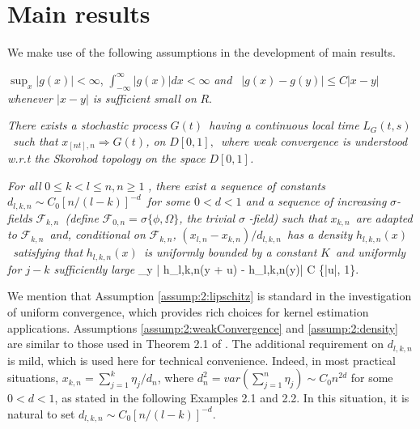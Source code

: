 \section{Main results}

We make use of the following assumptions in the development of main results.

\begin{assump} 
	$\sup_x|g(x)|<\infty$, $\int_{-\infty}^{\infty}|g(x)|dx<\infty$ \textit{and }\textit{\
	$|g(x)-g(y)|\le C|x-y|$ whenever  $|x-y|$ is sufficient small on }$R$.
\end{assump}

\begin{assump} 
\textit{There exists a stochastic process }%
$G(t)$\textit{\ having a continuous local time
}$L_{G}(t,s)$\textit{\ such that }$x_{[nt],n}\Rightarrow
G(t)$\textit{, on }$D[0,1],$\textit{\ where
weak convergence is understood w.r.t the Skorohod topology on the space }$%
D[0,1]$\textit{.}
\end{assump}

\begin{assump} 
 \textit{For all }$0\leq k<l\leq n,n\geq 1$ \textit{, there exist a sequence of constants }$d_{l,k,n}\sim C_0 [n/(l-k)]^{-d}$\textit{\ for some $0< d<1$
and a
sequence of increasing }$\sigma $\textit{-fields }${\mathcal F}_{k,n}$\textit{\ (define }$%
{\mathcal F}_{0,n}=\sigma \{\phi ,\Omega \}$\textit{, the trivial }$\sigma $\textit{%
-field) such that} $x_{k,n}$\textit{\ are adapted to }${\mathcal F}_{k,n}$\textit{\
and, conditional on }${\mathcal F}_{k,n}$\textit{,
}$(x_{l,n}-x_{k,n})/d_{l,k,n}$\textit{\ has a density
}$h_{l,k,n}(x)$\textit{\ satisfying that }$h_{l,k,n}(x)$\textit{\ is
uniformly bounded by a constant }$K$\textit{\ and uniformly for $j-k$ sufficiently large}
\be
 \sup_y | h_{l,k,n}(y + u) - h_{l,k,n}(y)| \le C \min\{|u|, 1\}. \la {eqn:2:77}
\ee
\end{assump}

We mention that Assumption \ref{assump:2:lipschitz} is standard in the investigation of uniform convergence,
which provides rich choices for kernel estimation applications. Assumptions \ref{assump:2:weakConvergence} and \ref{assump:2:density} are similar to those used in Theorem 2.1 of \cite{wangphillips2010a}. The additional requirement on $d_{l,k,n}$ is mild, which is used here for technical convenience.
Indeed, in  most practical situations, $x_{k,n}=\sum_{j=1}^k \eta_j/d_n$, where $d_n^2= var (\sum_{j=1}^n\eta_j)\sim C_0n^{2d}$ for some $0< d<1$, as stated in the following Examples 2.1 and 2.2. In this situation, it is natural to set $d_{l,k,n}\sim C_0 [n/(l-k)]^{-d}$.


